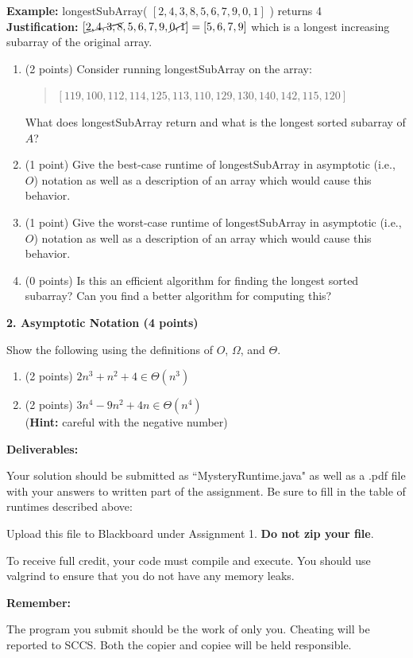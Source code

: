 \documentclass[12pt]{elsart}
\begin{document}
{\bf Example:}  longestSubArray( $[ 2, 4, 3, 8, 5, 6, 7, 9, 0, 1 ]$ ) returns 4 \\
{\bf Justification:} $[ \cancel{2, 4, 3, 8}, 5, 6, 7, 9, \cancel{0, 1} ] = [ 5, 6, 7, 9 ]$ which is a longest increasing subarray of the original array.

\begin{enumerate}
   \item (2 points) Consider running longestSubArray on the array:\\ 
   
   \begin{quote}
   $[119,100,112,114,125,113,110,129,130,140,142,115,120]$\\
   \end{quote}
   
   What does longestSubArray return and what is the longest sorted subarray of $A$?
   \item (1 point) Give the best-case runtime of longestSubArray in asymptotic (i.e., $O$) notation as well as a description of an array which would cause this behavior.  
   \item (1 point) Give the worst-case runtime of longestSubArray in asymptotic (i.e., $O$) notation as well as a description of an array which would cause this behavior.  
   \item (0 points) Is this an efficient algorithm for finding the longest sorted subarray?  Can you find a better algorithm for computing this?
\end{enumerate}


{\bf 2. Asymptotic Notation (4 points)}

Show the following using the definitions of $O$, $\Omega$, and $\Theta$.

\begin{enumerate}
   \item (2 points) $2n^3+n^2+4\in \Theta(n^3)$
   \item (2 points) $3n^4-9n^2+4n\in \Theta(n^4)$\\  ({\bf Hint:} careful with the negative number)
\end{enumerate}

{\bf Deliverables:}

Your solution should be submitted as ``MysteryRuntime.java" as well as a .pdf file with your answers to written part of the assignment.  Be sure to fill in the table of runtimes described above:

Upload this file to Blackboard under Assignment 1.  {\bf Do not zip your file}. 

To receive full credit, your code must compile and execute. You should use valgrind to
ensure that you do not have any memory leaks.

{\bf Remember:  

The program you submit should be the work of only you. Cheating will be reported to SCCS. Both the copier and copiee will be held responsible.}
\end{document}
